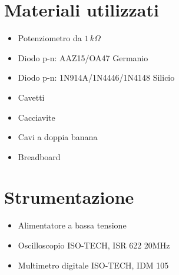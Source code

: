 \documentclass[]{article}
\begin{document}
\section{Materiali utilizzati}
\begin{itemize}
	\item Potenziometro da $ 1 \,k\Omega $
	\item Diodo p-n: AAZ15/OA47 Germanio
	\item Diodo p-n: 1N914A/1N4446/1N4148 Silicio
	\item Cavetti
	\item Cacciavite
	\item Cavi a doppia banana
	\item Breadboard
\end{itemize}
\section{Strumentazione}
\begin{itemize}
	\item Alimentatore a bassa tensione
	\item Oscilloscopio ISO-TECH, ISR 622 20MHz
	\item Multimetro digitale ISO-TECH, IDM 105
\end{itemize}
\end{document}
